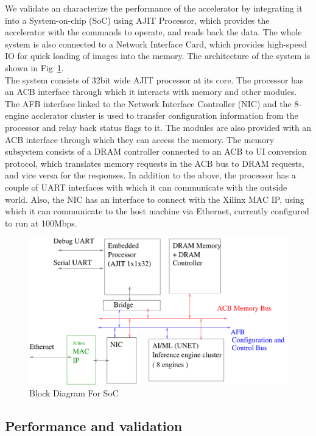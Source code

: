 \documentclass[a4paper,12pt, final]{report}
\begin{document}
We validate an characterize the performance of the accelerator by integrating it into a System-on-chip (SoC) using AJIT Processor, which provides the accelerator with the commands to operate, and reads back the data. The whole system is also connected to a Network Interface Card, which provides high-speed IO for quick loading of images into the memory. The architecture of the system is shown in Fig~\ref{fig:SOC}.
\\

The system consists of 32bit wide AJIT processor at its core. The processor has an ACB interface through which it interacts with memory and other modules. The AFB interface linked to the Network Interface Controller (NIC) and the 8-engine acclerator cluster is used to transfer configuration information from the processor and relay back status flags to it. The modules are also provided with an ACB interface through which they can access the memory. The memory subsystem consists of a DRAM controller connected to an ACB to UI conversion protocol, which translates memory requests in the ACB bus to DRAM requests, and vice versa for the responses. In addition to the above, the processor has a couple of UART interfaces with which it can communicate with the outside world. Also, the NIC has an interface to connect with the Xilinx MAC IP, using which it can communicate to the host machine via Ethernet, currently configured to run at 100Mbps. 
\\
\begin{figure}[h!]
    \centering
    \includegraphics[width=\textwidth]{BlockDiagram.pdf}
	\caption{Block Diagram For SoC}
    \label{fig:SOC}
\end{figure}

\subsection{Performance and validation}
\end{document}

